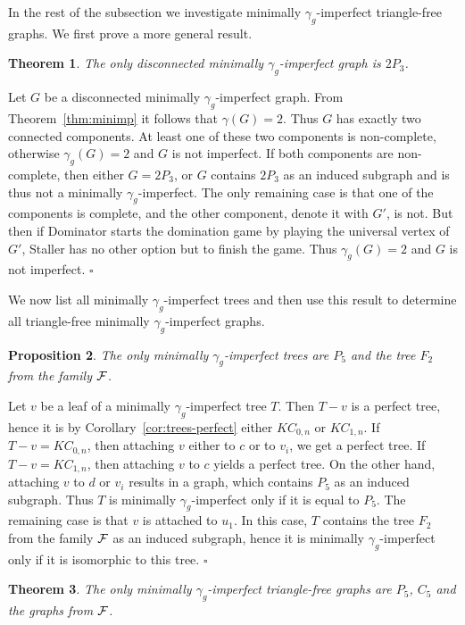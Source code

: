 \documentclass[12pt]{article}
\newtheorem{theorem}{Theorem}[section]
\newtheorem{proposition}[theorem]{Proposition}
\newcommand{\proof}{\noindent{\bf Proof.\ }}
\newcommand{\qed}{\hfill $\square$ \bigskip}
\newcommand{\cF}{{\cal F}}
\begin{document}
In the rest of the subsection we investigate minimally $\gamma_g$-imperfect triangle-free graphs. We first prove a more general result.

\begin{theorem}
	\label{thm:connected-imperfect}
	The only disconnected minimally $\gamma_g$-imperfect graph is $2 P_3$.
\end{theorem}

\proof
Let $G$ be a disconnected minimally $\gamma_g$-imperfect graph. From Theorem~\ref{thm:minimp} it follows that $\gamma(G) = 2$. Thus $G$ has exactly two connected components. At least one of these two components is non-complete, otherwise $\gamma_g(G) = 2$ and $G$ is not imperfect. If both components are non-complete, then either $G = 2 P_3$, or $G$ contains $2 P_3$ as an induced subgraph and is thus not a minimally $\gamma_g$-imperfect. The only remaining case is that one of the components is complete, and the other component, denote it with  $G'$, is not. But then if Dominator starts the domination game by playing the universal vertex of $G'$, Staller has no other option but to finish the game. Thus $\gamma_g(G) = 2$ and $G$ is not imperfect.
\qed

We now list all minimally $\gamma_g$-imperfect trees and then use this result to determine all triangle-free minimally $\gamma_g$-imperfect graphs.

\begin{proposition}
	\label{prop:trees-imperfect}
	The only minimally $\gamma_g$-imperfect trees are $P_5$ and the tree $F_2$ from the family $\cF$.
\end{proposition}

\proof
Let $v$ be a leaf of a minimally $\gamma_g$-imperfect tree $T$. Then $T-v$ is a perfect tree, hence it is by Corollary~\ref{cor:trees-perfect} either $KC_{0, n}$ or $KC_{1, n}$. If $T-v = KC_{0, n}$, then attaching $v$ either to $c$ or to $v_i$, we get a perfect tree. If $T-v = KC_{1, n}$, then attaching $v$ to $c$ yields a perfect tree. On the other hand, attaching $v$ to $d$ or $v_i$ results in a graph, which contains $P_5$ as an induced subgraph. Thus $T$ is minimally $\gamma_g$-imperfect only if it is equal to $P_5$. The remaining case is that $v$ is attached to $u_1$. In this case, $T$ contains the tree $F_2$ from the family $\cF$ as an induced subgraph, hence it is minimally $\gamma_g$-imperfect only if it is isomorphic to this tree.
\qed

\begin{theorem}
	\label{thm:triangle-free-imperfect}
	The only minimally $\gamma_g$-imperfect triangle-free graphs are $P_5$, $C_5$ and the graphs from $\cF$.
\end{theorem}
\end{document}
